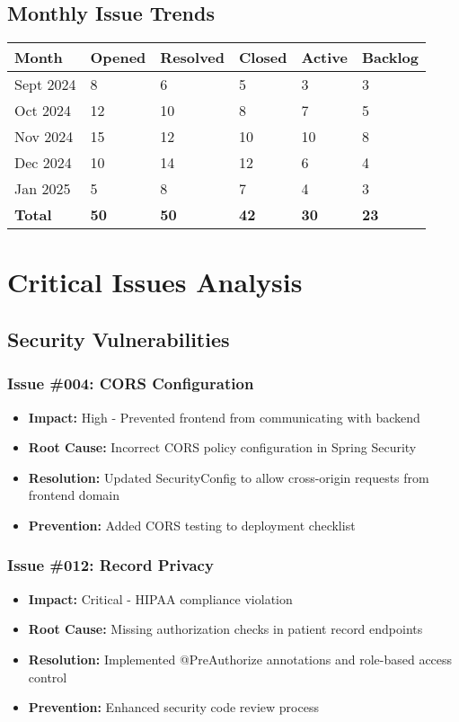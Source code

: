 \documentclass[12pt,a4paper]{article}
\begin{document}
\subsection{Monthly Issue Trends}

\begin{longtable}{|p{1.8cm}|p{1.8cm}|p{1.8cm}|p{1.8cm}|p{1.8cm}|p{1.8cm}|}
\hline
\textbf{Month} & \textbf{Opened} & \textbf{Resolved} & \textbf{Closed} & \textbf{Active} & \textbf{Backlog} \\
\hline
Sept 2024 & 8 & 6 & 5 & 3 & 3 \\
\hline
Oct 2024 & 12 & 10 & 8 & 7 & 5 \\
\hline
Nov 2024 & 15 & 12 & 10 & 10 & 8 \\
\hline
Dec 2024 & 10 & 14 & 12 & 6 & 4 \\
\hline
Jan 2025 & 5 & 8 & 7 & 4 & 3 \\
\hline
\textbf{Total} & \textbf{50} & \textbf{50} & \textbf{42} & \textbf{30} & \textbf{23} \\
\hline
\end{longtable}

\section{Critical Issues Analysis}

\subsection{Security Vulnerabilities}

\subsubsection{Issue \#004: CORS Configuration}
\begin{itemize}
    \item \textbf{Impact:} High - Prevented frontend from communicating with backend
    \item \textbf{Root Cause:} Incorrect CORS policy configuration in Spring Security
    \item \textbf{Resolution:} Updated SecurityConfig to allow cross-origin requests from frontend domain
    \item \textbf{Prevention:} Added CORS testing to deployment checklist
\end{itemize}

\subsubsection{Issue \#012: Record Privacy}
\begin{itemize}
    \item \textbf{Impact:} Critical - HIPAA compliance violation
    \item \textbf{Root Cause:} Missing authorization checks in patient record endpoints
    \item \textbf{Resolution:} Implemented @PreAuthorize annotations and role-based access control
    \item \textbf{Prevention:} Enhanced security code review process
\end{itemize}
\end{document}
